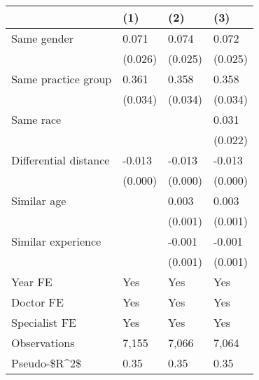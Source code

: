 \begin{tabular}{llll}
\hline
& (1) & (2) & (3) \\ \hline
Same gender                        & 0.071   & 0.074   & 0.072   \\
& (0.026) & (0.025) & (0.025) \\
Same practice group                & 0.361   & 0.358   & 0.358   \\
& (0.034) & (0.034) & (0.034) \\
Same race                          &         &         & 0.031   \\
&         &         & (0.022) \\
Differential distance              & -0.013  & -0.013  & -0.013  \\
& (0.000) & (0.000) & (0.000) \\
Similar age                        &         & 0.003   & 0.003   \\
&         & (0.001) & (0.001) \\
Similar experience                 &         & -0.001  & -0.001  \\
&         & (0.001) & (0.001) \\
Year FE                            & Yes     & Yes     & Yes     \\
Doctor FE                          & Yes     & Yes     & Yes     \\
Specialist FE                      & Yes     & Yes     & Yes     \\
Observations                       & 7,155   & 7,066   & 7,064   \\
Pseudo-\$R\textasciicircum{}2\$ & 0.35    & 0.35    & 0.35    \\
\hline
\end{tabular}
